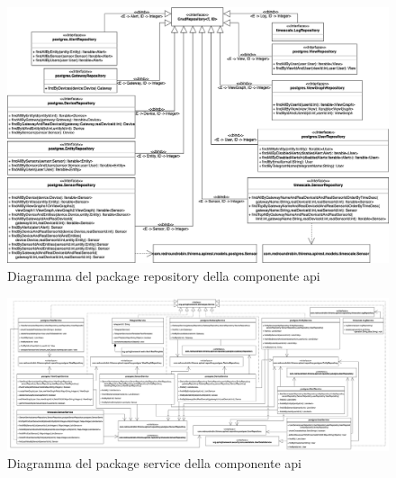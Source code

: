 		\begin{landscape}
		\begin{figure}[H]
			\centering
			\includegraphics[scale=0.525]{res/images/API/RepositoryPackage.png}
			\caption{Diagramma del package repository della componente api}
			\label{Diagramma 15}
		\end{figure}
		\begin{figure}[H]
			\centering
			\includegraphics[scale=0.300]{res/images/API/ServicePackage.png}
			\caption{Diagramma del package service della componente api}
			\label{Diagramma 16}
		\end{figure}
		

\end{landscape}
